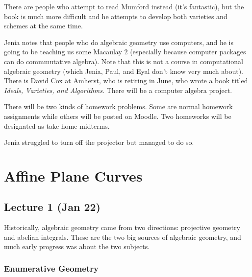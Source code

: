 \documentclass[twoside, 10pt]{article}
\begin{document}
    There are people who attempt to read Mumford instead (it's fantastic), but
    the book is much more difficult and he attempts to develop both varieties
    and schemes at the same time.

    Jenia notes that people who do algebraic geometry use computers, and he is
    going to be teaching us some Macaulay 2 (especially because computer
    packages can do commmutative algebra). Note that this is not a course in
    computational algebraic geometry (which Jenia, Paul, and Eyal don't know
    very much about). There is David Cox at Amherst, who is retiring in June,
    who wrote a book titled \emph{Ideals, Varieties, and Algorithms}. There
    will be a computer algebra project.

    There will be two kinds of homework problems. Some are normal homework
    assignments while others will be posted on Moodle. Two homeworks will be
    designated as take-home midterms.

    Jenia struggled to turn off the projector but managed to do so.

    \section{Affine Plane Curves}

    \subsection{Lecture 1 (Jan 22)} Historically, algebraic geometry came from
    two directions: projective geometry and abelian integrals. These are the
    two big sources of algebraic geometry, and much early progress was about
    the two subjects.

    \subsubsection{Enumerative Geometry}
\end{document}
